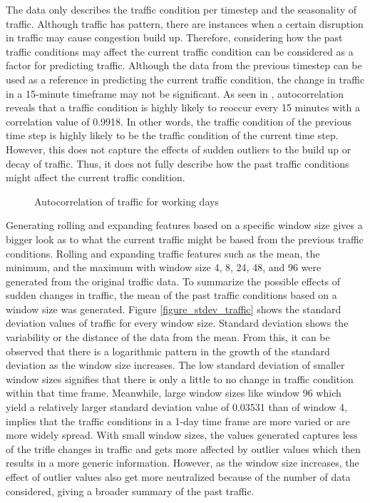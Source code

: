 The data only describes the traffic condition per timestep and the seasonality of traffic. Although traffic has pattern, there are instances when a certain disruption in traffic may cause congestion build up. Therefore, considering how the past traffic conditions may affect the current traffic condition can be considered as a factor for predicting traffic. Although the data from the previous timestep can be used as a reference in predicting the current traffic condition, the change in traffic in a 15-minute timeframe may not be significant. As seen in , autocorrelation reveals that a traffic condition is highly likely to reoccur every 15 minutes with a correlation value of 0.9918. In other words, the traffic condition of the previous time step is highly likely to be the traffic condition of the current time step. However, this does not capture the effects of sudden outliers to the build up or decay of traffic. Thus, it does not fully describe how the past traffic conditions might affect the current traffic condition. 

\begin{figure}
  \centering
  \captionsetup{justification=centering}
  \caption{Autocorrelation of traffic for working days}
  \label{figure_autocorr_traffic_workingdays}
\end{figure}

Generating rolling and expanding features based on a specific window size gives a bigger look as to what the current traffic might be based from the previous traffic conditions. Rolling and expanding traffic features such as the mean, the minimum, and the maximum with window size  4, 8, 24, 48, and 96 were generated from the original traffic data. To summarize the possible effects of sudden changes in traffic, the mean of the past traffic conditions based on a window size was generated. Figure \ref{figure_stdev_traffic} shows the standard deviation values of traffic for every window size. Standard deviation shows the variability or the distance of the data from the mean. From this, it can be observed that there is a logarithmic pattern in the growth of the standard deviation as the window size increases. The low standard deviation of smaller window sizes signifies that there is only a little to no change in traffic condition within that time frame. Meanwhile, large window sizes like window 96 which yield a relatively larger standard deviation value of 0.03531 than of window 4, implies that the traffic conditions in a 1-day time frame are more varied or are more widely spread. With small window sizes, the values generated captures less of the trifle changes in traffic and gets more affected by outlier values which then results in a more generic information. However, as the window size increases, the effect of outlier values also get more neutralized because of the number of data considered, giving a broader summary of the past traffic. 

